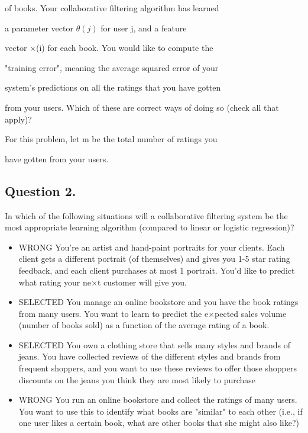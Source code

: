 \documentclass[11pt]{article} %
\begin{document}
of books. Your collaborative filtering algorithm has learned

a parameter vector $\theta(j)$ for user j, and a feature

vector $ \times $(i) for each book. You would like to compute the

"training error", meaning the average squared error of your

system's predictions on all the ratings that you have gotten

from your users. Which of these are correct ways of doing so (check all that apply)?

For this problem, let m be the total number of ratings you

have gotten from your users. 
%
%
%
%
%
%


\subsection*{Question 2. } 

In which of the following situations will a collaborative filtering system be the most appropriate learning algorithm (compared to linear or logistic regression)?

\begin{itemize}
\item WRONG You're an artist and hand-paint portraits for your clients. Each client gets a different portrait (of themselves) and gives you 1-5 star rating feedback, and each client purchases at most 1 portrait. You'd like to predict what rating your ne$ \times $t customer will give you.

\item SELECTED You manage an online bookstore and you have the book ratings from many users. You want to learn to predict the e$ \times $pected sales volume (number of books sold) as a function of the average rating of a book.

\item SELECTED You own a clothing store that sells many styles and brands of jeans. You have collected reviews of the different styles and brands from frequent shoppers, and you want to use these reviews to offer those shoppers discounts on the jeans you think they are most likely to purchase

\item WRONG You run an online bookstore and collect the ratings of many users. You want to use this to identify what books are "similar" to each other (i.e., if one user likes a certain book, what are other books that she might also like?)
\end{itemize}
\end{document}
